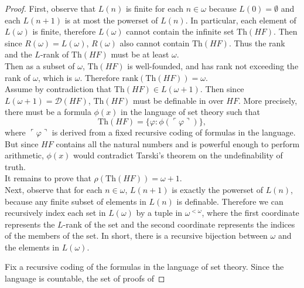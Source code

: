 \documentclass{article}
\begin{document}
  \begin{proof}
    First, observe that $L(n)$ is finite for each $n\in\omega$ because
    $L(0)=\emptyset$ and each $L(n+1)$ is at most the powerset of $L(n)$.
    In particular, each element of $L(\omega)$ is finite, therefore
    $L(\omega)$ cannot contain the infinite set $\text{Th}(HF)$. Then since
    $R(\omega)=L(\omega)$, $R(\omega)$ also cannot contain $\text{Th}(HF)$.
    Thus the rank and the $L$-rank of $\text{Th}(HF)$ must be at least
    $\omega$. \\

    Then as a subset of $\omega$, $\text{Th}(HF)$ is well-founded, and has
    rank not exceeding the rank of $\omega$, which is $\omega$. Therefore
    $\text{rank}(\text{Th}(HF)) =\omega$. \\

    Assume by contradiction that $\text{Th}(HF) \in L(\omega+1)$. Then
    since $L(\omega+1) =\mathcal{D}(HF)$, $\text{Th}(HF)$ must be definable
    in over $HF$. More precisely, there must be a formula $\phi(x)$ in the
    language of set theory such that
    \[\text{Th}(HF) =\{\varphi: \phi(\ulcorner\varphi\urcorner)\},\]
    where $\ulcorner\varphi\urcorner$ is derived from a fixed recursive
    coding of formulas in the language. But since $HF$ contains all the
    natural numbers and is powerful enough to perform arithmetic,
    $\phi(x)$ would contradict Tarski's theorem on the undefinability of
    truth. \\ 

    It remains to prove that $\rho(\text{Th}(HF)) =\omega+1$. \\

    Next, observe that for each $n\in\omega$, $L(n+1)$ is exactly the
    powerset of $L(n)$, because any finite subset of elements in $L(n)$ is
    definable. Therefore we can recursively index each set in $L(\omega)$
    by a tuple in $\omega^{<\omega}$, where the first coordinate represents
    the $L$-rank of the set and the second coordinate represents the
    indices of the members of the set. In short, there is a recursive
    bijection between $\omega$ and the elements in $L(\omega)$.

    Fix a recursive coding of the formulas in the language of set theory.
    Since the language is countable, the set of proofs of



\end{proof}
\end{document}
